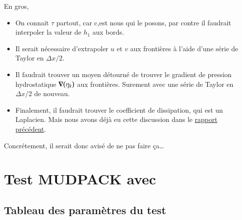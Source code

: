 \documentclass[10pt]{article}
\numberwithin{equation}{section}
\begin{document}
En gros,
\begin{itemize}
\item On connait \(\tau\) partout, car c,est nous qui le posons, par contre il faudrait interpoler la valeur de \(h_1\) aux bords.
\item Il serait nécessaire d'extrapoler \(u\) et \(v\) aux frontières à l'aide d'une série de Taylor en \(\Delta x/2\).
\item Il faudrait trouver un moyen détourné de trouver le gradient de pression hydrostatique \(\gradient(\eta_k)\) aux frontières. Surement avec une série de Taylor en \(\Delta x/2\) de nouveau.
\item Finalement, il faudrait trouver le coefficient de dissipation, qui est un Laplacien. Mais nous avons déjà eu cette discussion dans le \href{rapport-2023-04-21.org}{rapport précédent}.
\end{itemize}

Concrétement, il serait donc avisé de ne pas faire ça\ldots{}


\section{Test MUDPACK avec}
\label{sec:orgdbacf84}
\subsection{Tableau des paramètres du test}
\label{sec:orgfed1cbf}
\end{document}
